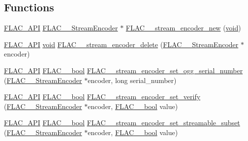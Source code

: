 \subsection*{Functions}
\begin{DoxyCompactItemize}
\item 
\hyperlink{group__flac__export_ga56ca07df8a23310707732b1c0007d6f5}{F\+L\+A\+C\+\_\+\+A\+PI} \hyperlink{struct_f_l_a_c_____stream_encoder}{F\+L\+A\+C\+\_\+\+\_\+\+Stream\+Encoder} $\ast$ \hyperlink{group__flac__stream__encoder_ga35f3d94452bcf0a90a31c7d770b200bc}{F\+L\+A\+C\+\_\+\+\_\+stream\+\_\+encoder\+\_\+new} (\hyperlink{png_8h_ac9c84fa68bbad002983e35ce3663c686}{void})
\item 
\hyperlink{group__flac__export_ga56ca07df8a23310707732b1c0007d6f5}{F\+L\+A\+C\+\_\+\+A\+PI} \hyperlink{png_8h_ac9c84fa68bbad002983e35ce3663c686}{void} \hyperlink{group__flac__stream__encoder_ga9c9956af42bebe923da59437628aa9ea}{F\+L\+A\+C\+\_\+\+\_\+stream\+\_\+encoder\+\_\+delete} (\hyperlink{struct_f_l_a_c_____stream_encoder}{F\+L\+A\+C\+\_\+\+\_\+\+Stream\+Encoder} $\ast$encoder)
\item 
\hyperlink{group__flac__export_ga56ca07df8a23310707732b1c0007d6f5}{F\+L\+A\+C\+\_\+\+A\+PI} \hyperlink{ordinals_8h_a95103469f1cbd78b8cf250194985b34e}{F\+L\+A\+C\+\_\+\+\_\+bool} \hyperlink{group__flac__stream__encoder_ga646c9800d42620a6c504fbdfbd092666}{F\+L\+A\+C\+\_\+\+\_\+stream\+\_\+encoder\+\_\+set\+\_\+ogg\+\_\+serial\+\_\+number} (\hyperlink{struct_f_l_a_c_____stream_encoder}{F\+L\+A\+C\+\_\+\+\_\+\+Stream\+Encoder} $\ast$encoder, long serial\+\_\+number)
\item 
\hyperlink{group__flac__export_ga56ca07df8a23310707732b1c0007d6f5}{F\+L\+A\+C\+\_\+\+A\+PI} \hyperlink{ordinals_8h_a95103469f1cbd78b8cf250194985b34e}{F\+L\+A\+C\+\_\+\+\_\+bool} \hyperlink{group__flac__stream__encoder_ga5f4ac18a7207d2864fed72d284486f9e}{F\+L\+A\+C\+\_\+\+\_\+stream\+\_\+encoder\+\_\+set\+\_\+verify} (\hyperlink{struct_f_l_a_c_____stream_encoder}{F\+L\+A\+C\+\_\+\+\_\+\+Stream\+Encoder} $\ast$encoder, \hyperlink{ordinals_8h_a95103469f1cbd78b8cf250194985b34e}{F\+L\+A\+C\+\_\+\+\_\+bool} value)
\item 
\hyperlink{group__flac__export_ga56ca07df8a23310707732b1c0007d6f5}{F\+L\+A\+C\+\_\+\+A\+PI} \hyperlink{ordinals_8h_a95103469f1cbd78b8cf250194985b34e}{F\+L\+A\+C\+\_\+\+\_\+bool} \hyperlink{group__flac__stream__encoder_ga163f1acfe8b6b8ae849f0f4f7c0708f4}{F\+L\+A\+C\+\_\+\+\_\+stream\+\_\+encoder\+\_\+set\+\_\+streamable\+\_\+subset} (\hyperlink{struct_f_l_a_c_____stream_encoder}{F\+L\+A\+C\+\_\+\+\_\+\+Stream\+Encoder} $\ast$encoder, \hyperlink{ordinals_8h_a95103469f1cbd78b8cf250194985b34e}{F\+L\+A\+C\+\_\+\+\_\+bool} value)

\end{DoxyCompactItemize}
